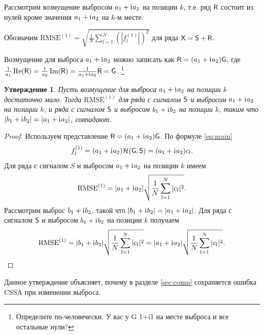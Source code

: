 \documentclass[specialist,
               substylefile = spbu.rtx,
               subf,href,colorlinks=true, 12pt]{disser}
\newtheorem{statement}{Утверждение}
\begin{document}
Рассмотрим возмущение выбросом $a_1 + \mathrm{i}\mkern1mu a_2$ на позиции $k$, т.е. ряд $\textsf{R}$ состоит из нулей кроме значения $a_1 + \mathrm{i}\mkern1mu a_2$ на $k$-м месте.

Обозначим $\text{RMSE}^{(1)} = \sqrt{\frac{1}{N}\sum_{l = 1}^{N} (|f^{(1)}_l|)^2}$ для ряда $\textsf{X} = \textsf{S} + \textsf{R}$.

Возмущение для выброса $a_1 + \mathrm{i}\mkern1mu a_2$ можно записать как  $\textsf{R} = (a_1 + \mathrm{i}\mkern1mu a_2)\textsf{G}$, где $\frac{1}{a_1}\Re(\textsf{R}) = \frac{1}{a_2}\Im(\textsf{R}) = \frac{1}{a_1 + \mathrm{i}\mkern1mu a_2}\textsf{R} = \textsf{G}$.
\footnote{Определите по-человечески. У вас у G 1+i1 на месте выброса и все остальные нули?}

\begin{statement}\label{st:RMSEinv}
	Пусть возмущение для выброса $a_1 + \mathrm{i}\mkern1mu a_2$ на позиции $k$ достаточно мало.
	Тогда $\text{RMSE}^{(1)}$ для ряда с сигналом $\textsf{S}$ и выбросом $a_1 + \mathrm{i}\mkern1mu a_2$ на позиции $k$, и  ряда с сигналом $\textsf{S}$ и выбросом $b_1 + \mathrm{i}\mkern1mu b_2$ на позиции $k$, таким что $|b_1 + \mathrm{i}\mkern1mu b_2| = |a_1 + \mathrm{i}\mkern1mu a_2|$, совпадают.
\end{statement}
\begin{proof}
	Используем представление $\textsf{R} = (a_1 + \mathrm{i}\mkern1mu a_2)\textsf{G}$.
	По формуле \eqref{eq:main}
	$$f^{(1)}_l = (a_1 + \mathrm{i}\mkern1mu a_2)\mathcal{H}(\textsf{G}, \textsf{S}) = (a_1 + \mathrm{i}\mkern1mu a_2)c_l.$$
	Для ряда с сигналом $S$ и выбросом $a_1 + \mathrm{i}\mkern1mu a_2$ на позиции $k$ имеем
	$$\text{RMSE}^{(1)} = |a_1 + \mathrm{i}\mkern1mu a_2|\sqrt{\frac{1}{N}\sum_{l = 1}^{N} |c_l|^2}. $$
	Рассмотрим выброс $b_1 + \mathrm{i}\mkern1mu b_2$, такой что $|b_1 + \mathrm{i}\mkern1mu b_2| = |a_1 + \mathrm{i}\mkern1mu a_2|$.
	Для ряда с сигналом $\textsf{S}$ и выбросом $b_1 + \mathrm{i}\mkern1mu b_2$ на позиции $k$ получаем
	$$\text{RMSE}^{(1)} = |b_1 + \mathrm{i}\mkern1mu b_2| \sqrt{\frac{1}{N}\sum_{l = 1}^{N} |c_l|^2} = |a_1 + \mathrm{i}\mkern1mu a_2| \sqrt{\frac{1}{N}\sum_{l = 1}^{N} |c_l|^2}.$$
\end{proof}

Данное утверждение объясняет, почему в разделе \ref{sec:comp} сохраняется ошибка CSSA при изменении выброса.
\end{document}
